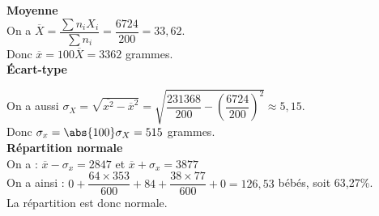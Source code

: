 \vspace*{.3cm}

\textbf{Moyenne} \\

On a $\overline{X} = \dfrac{\displaystyle{\sum n_iX_i}}{\displaystyle{\sum n_i}} = \dfrac{6724}{200} = 33,62. $ \\

Donc $\overline{x} = 100\overline{X} = 3362$ grammes. \\

\textbf{Écart-type} 

On a aussi $\sigma_X = \sqrt{\overline{x^2} - \overline{x}^2} = \sqrt{\dfrac{231368}{200} - \left(\dfrac{6724}{200}\right)^2} \approx 5,15$. \\

Donc $ \sigma_x = \abs{100}\sigma_X = 515$ grammes.  \\

\textbf{Répartition normale} \\

On a : $\overline{x} - \sigma_x = 2847$ et $\overline{x} + \sigma_x = 3877$ \\

On a ainsi : $ 0 + \dfrac{64 \times 353}{600} + 84 + \dfrac{38 \times 77}{600} + 0 = 126,53$ bébés, soit 63,27\%. \\

La répartition est donc normale.